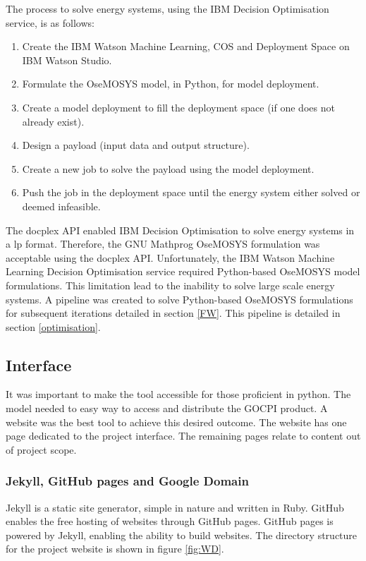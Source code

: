 \documentclass[12pt]{article}
\begin{document}
The process to solve energy systems, using the IBM Decision Optimisation service, is as follows:
\begin{enumerate}
	\item Create the IBM Watson Machine Learning, COS and Deployment Space on IBM Watson Studio.
	\item Formulate the OseMOSYS model, in Python, for model deployment.
	\item Create a model deployment to fill the deployment space (if one does not already exist).
	\item Design a payload (input data and output structure).
	\item Create a new job to solve the payload using the model deployment.
	\item Push the job in the deployment space until the energy system either solved or deemed infeasible.
\end{enumerate}

The docplex API enabled IBM Decision Optimisation to solve energy systems in a lp format.
Therefore, the GNU Mathprog OseMOSYS formulation was acceptable using the docplex API. 
Unfortunately, the IBM Watson Machine Learning Decision Optimisation service required Python-based OseMOSYS model formulations.
This limitation lead to the inability to solve large scale energy systems.
A pipeline was created to solve Python-based OseMOSYS formulations for subsequent iterations detailed in section \ref{FW}.
This pipeline is detailed in section \ref{optimisation}.

\subsection{Interface}
It was important to make the tool accessible for those proficient in python.
The model needed to easy way to access and distribute the GOCPI product.
A website was the best tool to achieve this desired outcome.
The website has one page dedicated to the project interface.
The remaining pages relate to content out of project scope.

\subsubsection{Jekyll, GitHub pages and Google Domain}
Jekyll is a static site generator, simple in nature and written in Ruby.
GitHub enables the free hosting of websites through GitHub pages.
GitHub pages is powered by Jekyll, enabling the ability to build websites.
The directory structure for the project website is shown in figure \ref{fig:WD}.
\end{document}
